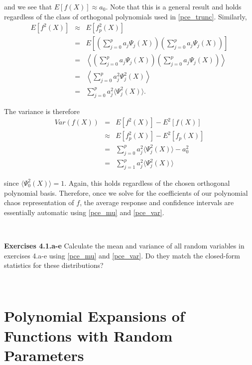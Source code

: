 \documentclass[11pt]{article}
\numberwithin{equation}{section}
\begin{document}
and we see that $E[ f(X) ] \approx a_0$. Note that this is a general result and holds regardless of the class of orthogonal polynomials used in \eqref{pce_trunc}. Similarly,
\begin{eqnarray*}
E [ f^2(X) ] & \approx & E [ f_p^2(X) ] \\
& = & E \left[ \left( \sum_{j = 0}^p a_j \Psi_j(X) \right) \left( \sum_{j = 0}^p a_j \Psi_j(X) \right) \right] \\
& = & \left\langle \left( \sum_{j = 0}^p a_j \Psi_j(X) \right) \left( \sum_{j = 0}^p a_j \Psi_j(X) \right) \right\rangle \\
& = & \left\langle \sum_{j = 0}^p a_j^2 \Psi_j^2(X) \right\rangle \\
& = & \sum_{j = 0}^p a_j^2  \langle \Psi_j^2(X) \rangle.
\end{eqnarray*}

The variance is therefore
\begin{eqnarray}
Var(f(X)) & = & E \left[ f^2(X) \right] - E^2 \left[ f(X) \right] \nonumber \\
& \approx & E \left[ f_p^2(X) \right] - E^2 \left[ f_p(X) \right] \nonumber \\
& = & \sum_{j = 0}^p a_j^2  \langle \Psi_j^2(X) \rangle - a_0^2  \nonumber \\
& = & \sum_{j = 1}^p a_j^2  \langle \Psi_j^2(X) \rangle \label{pce_var}
\end{eqnarray}

since $\langle \Psi_0^2(X) \rangle = 1$. Again, this holds regardless of the chosen orthogonal polynomial basis. Therefore, once we solve for the coefficients of our polynomial chaos representation of $f$, the average response and confidence intervals are essentially automatic using \eqref{pce_mu} and \eqref{pce_var}.

\

\textbf{Exercises 4.1.a-e} Calculate the mean and variance of all random variables in exercises 4.a-e using \eqref{pce_mu} and \eqref{pce_var}. Do they match the closed-form statistics for these distributions?

\











\section{Polynomial Expansions of Functions with Random Parameters}
\end{document}
